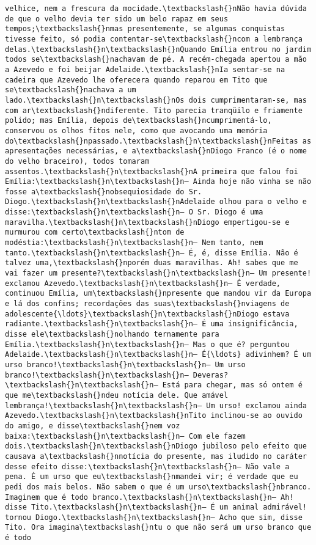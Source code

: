 \documentclass[11pt]{article}
\begin{document}
\begin{Verbatim}[commandchars=\\\{\}]
velhice, nem a frescura da mocidade.\textbackslash{}nNão havia dúvida de que o velho devia ter sido um belo rapaz em seus tempos;\textbackslash{}nmas presentemente, se algumas conquistas tivesse feito, só podia contentar-se\textbackslash{}ncom a lembrança delas.\textbackslash{}n\textbackslash{}nQuando Emília entrou no jardim todos se\textbackslash{}nachavam de pé. A recém-chegada apertou a mão a Azevedo e foi beijar Adelaide.\textbackslash{}nIa sentar-se na cadeira que Azevedo lhe oferecera quando reparou em Tito que se\textbackslash{}nachava a um lado.\textbackslash{}n\textbackslash{}nOs dois cumprimentaram-se, mas com ar\textbackslash{}ndiferente. Tito parecia tranqüilo e friamente polido; mas Emília, depois de\textbackslash{}ncumprimentá-lo, conservou os olhos fitos nele, como que avocando uma memória do\textbackslash{}npassado.\textbackslash{}n\textbackslash{}nFeitas as apresentações necessárias, e a\textbackslash{}nDiogo Franco (é o nome do velho braceiro), todos tomaram assentos.\textbackslash{}n\textbackslash{}nA primeira que falou foi Emília:\textbackslash{}n\textbackslash{}n— Ainda hoje não vinha se não fosse a\textbackslash{}nobsequiosidade do Sr. Diogo.\textbackslash{}n\textbackslash{}nAdelaide olhou para o velho e disse:\textbackslash{}n\textbackslash{}n— O Sr. Diogo é uma maravilha.\textbackslash{}n\textbackslash{}nDiogo empertigou-se e murmurou com certo\textbackslash{}ntom de modéstia:\textbackslash{}n\textbackslash{}n— Nem tanto, nem tanto.\textbackslash{}n\textbackslash{}n— É, é, disse Emília. Não é talvez uma,\textbackslash{}nporém duas maravilhas. Ah! sabes que me vai fazer um presente?\textbackslash{}n\textbackslash{}n— Um presente! exclamou Azevedo.\textbackslash{}n\textbackslash{}n— É verdade, continuou Emília, um\textbackslash{}npresente que mandou vir da Europa e lá dos confins; recordações das suas\textbackslash{}nviagens de adolescente{\ldots}\textbackslash{}n\textbackslash{}nDiogo estava radiante.\textbackslash{}n\textbackslash{}n— É uma insignificância, disse ele\textbackslash{}nolhando ternamente para Emília.\textbackslash{}n\textbackslash{}n— Mas o que é? perguntou Adelaide.\textbackslash{}n\textbackslash{}n— É{\ldots} adivinhem? É um urso branco!\textbackslash{}n\textbackslash{}n— Um urso branco!\textbackslash{}n\textbackslash{}n— Deveras?\textbackslash{}n\textbackslash{}n— Está para chegar, mas só ontem é que me\textbackslash{}ndeu notícia dele. Que amável lembrança!\textbackslash{}n\textbackslash{}n— Um urso! exclamou ainda Azevedo.\textbackslash{}n\textbackslash{}nTito inclinou-se ao ouvido do amigo, e disse\textbackslash{}nem voz baixa:\textbackslash{}n\textbackslash{}n— Com ele fazem dois.\textbackslash{}n\textbackslash{}nDiogo jubiloso pelo efeito que causava a\textbackslash{}nnotícia do presente, mas iludido no caráter desse efeito disse:\textbackslash{}n\textbackslash{}n— Não vale a pena. É um urso que eu\textbackslash{}nmandei vir; é verdade que eu pedi dos mais belos. Não sabem o que é um urso\textbackslash{}nbranco. Imaginem que é todo branco.\textbackslash{}n\textbackslash{}n— Ah! disse Tito.\textbackslash{}n\textbackslash{}n— É um animal admirável! tornou Diogo.\textbackslash{}n\textbackslash{}n— Acho que sim, disse Tito. Ora imagina\textbackslash{}ntu o que não será um urso branco que é todo 
\end{Verbatim}
\end{document}
